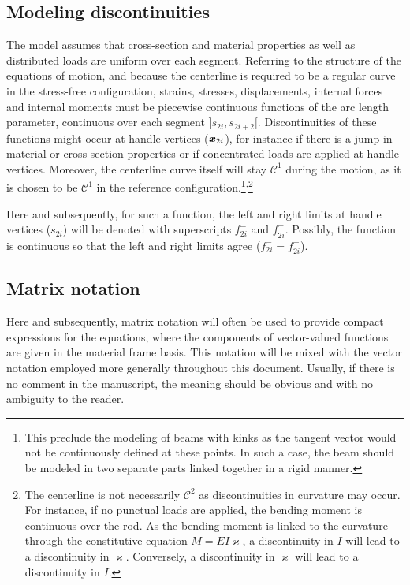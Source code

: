  \subsection{Modeling discontinuities}
The model assumes that cross-section and material properties as well as distributed loads are uniform over each segment. Referring to the structure of the equations of motion, and because the centerline is required to be a regular curve in the stress-free configuration, strains, stresses, displacements, internal forces and internal moments must be piecewise continuous functions of the arc length parameter, continuous over each segment $]s_{2i},s_{2i+2}[$. Discontinuities of these functions might occur at handle vertices ($\boldsymbol{x}_{2i}$), for instance if there is a jump in material or cross-section properties or if concentrated loads are applied at handle vertices. Moreover, the centerline curve itself will stay $\mathcal{C}^1$ during the motion, as it is chosen to be $\mathcal{C}^1$ in the reference configuration.\footnote{This preclude the modeling of beams with kinks as the tangent vector would not be continuously defined at these points. In such a case, the beam should be modeled in two separate parts linked together in a rigid manner.}\textsuperscript{,}\footnote{The centerline is not necessarily $\mathcal{C}^2$ as discontinuities in curvature may occur. For instance, if no punctual loads are applied, the bending moment is continuous over the rod. As the bending moment is linked to the curvature through the constitutive equation $M = EI\varkappa$, a discontinuity in $I$ will lead to a discontinuity in $\varkappa$. Conversely, a discontinuity in $\varkappa$ will lead to a discontinuity in $I$.}

Here and subsequently, for such a function, the left and right limits at handle vertices ($s_{2i}$) will be denoted with superscripts $f_{2i}^-$ and $f_{2i}^+$. Possibly, the function is continuous so that the left and right limits agree ($f_{2i}^- = f_{2i}^+$).

\subsection{Matrix notation}
Here and subsequently, matrix notation will often be used to provide compact expressions for the equations, where the components of vector-valued functions are given in the material frame basis. This notation will be mixed with the vector notation employed  more generally throughout this document. Usually, if there is no comment in the manuscript, the meaning should be obvious and with no ambiguity to the reader.


